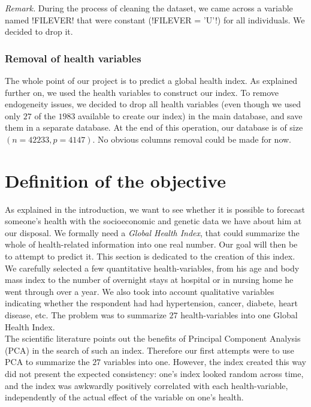 \documentclass[]{article}
\begin{document}
\noindent
\textit{Remark.} During the process of cleaning the dataset, we came across a variable named \pyth!FILEVER! that were constant (\pyth!FILEVER = 'U'!) for all individuals. We decided to drop it.

\subsubsection{Removal of health variables}
The whole point of our project is to predict a global health index. As explained further on, we used the health variables to construct our index. To remove endogeneity issues, we decided to drop all health variables (even though we used only $27$ of the $1983$ available to create our index) in the main database, and save them in a separate database. At the end of this operation, our database is of size $(n = 42233, p = 4147)$. No obvious columns removal could be made for now.

\section{Definition of the objective}
As explained in the introduction, we want to see whether it is possible to forecast someone's health with the socioeconomic and genetic data we have about him at our disposal. We formally need a \textit{Global Health Index}, that could summarize the whole of health-related information into one real number. Our goal will then be to attempt to predict it. This section is dedicated to the creation of this index.\\

\noindent
We carefully selected a few quantitative health-variables, from his age and body mass index to the number of overnight stays at hospital or in nursing home he went through over a year. We also took into account qualitative variables indicating whether the respondent had had hypertension, cancer, diabete, heart disease, etc. The problem was to summarize $27$ health-variables into one Global Health Index.\\

\noindent
The scientific literature points out the benefits of Principal Component Analysis (PCA) in the search of such an index. Therefore our first attempts were to use PCA to summarize the $27$ variables into one. However, the index created this way did not present the expected consistency: one's index looked random across time, and the index was awkwardly positively correlated with each health-variable, independently of the actual effect of the variable on one's health.\\
\end{document}
